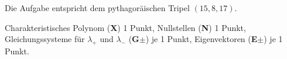 \begin{diskussion}
Die Aufgabe entspricht dem pythagoräischen Tripel $(15,8,17)$.
\end{diskussion}

\begin{bewertung}
Charakteristisches Polynom ({\bf X}) 1 Punkt,
Nullstellen ({\bf N}) 1 Punkt,
Gleichungssysteme für $\lambda_+$ und $\lambda_-$ ({\bf G$\pm$}) je 1 Punkt,
Eigenvektoren ({\bf E$\pm$}) je 1 Punkt.
\end{bewertung}

